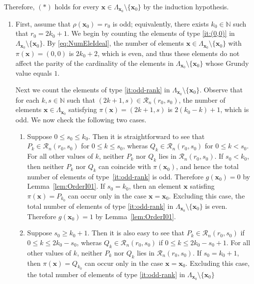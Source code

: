 \documentclass[a4paper,11pt]{amsart}
\theoremstyle{definition}
\newenvironment{demo}[1]{%
  \trivlist
  \item[\hskip\labelsep
        {\bf #1.}]
}{%
\hfill\qedsymbol
  \endtrivlist
}
\numberwithin{equation}{section}
\def\Non{\mathbb{N}}
\def\R#1{\mathcal{R}_{#1}}
\def\x{\boldsymbol{x}}
\def\rkf{\rho}
\begin{document}
\begin{demo}{Proof of Theorem~\ref{th:ASM-ideal}}
Therefore, $(*)$ holds for every $\x\in\Lambda_{\x_{0}}\setminus\{\x_{0}\}$ by the induction hypothesis.
%
\begin{enumerate}[label=\arabic*), leftmargin=20pt]
%
\item
First, assume that $\rkf(\x_{0})=r_{0}$ is odd;
equivalently, there exists $k_{0}\in\Non$ such that $r_{0}=2k_{0}+1$.
We begin by counting the elements of type \ref{it:(0,0)} in $\Lambda_{\x_{0}}\setminus\{\x_{0}\}$.
By \eqref{eq:NumEleIdeal},
the number of elements $\x\in\Lambda_{\x_{0}}\setminus\{\x_{0}\}$ with $\pi(\x)=(0,0)$ is $2k_{0}+2$,
which is even,
and thus these elements do not affect the parity of the cardinality of the elements in $\Lambda_{\x_{0}}\setminus\{\x_{0}\}$ 
whose Grundy value equals $1$.
%
\par
%
Next we count the elements of type \ref{it:odd-rank} in $\Lambda_{\x_{0}}\setminus\{\x_{0}\}$.
Observe that for each $k,s\in\Non$ such that $(2k+1,s)\in\R{n}(r_{0},s_{0})$,
the number of elements $\x\in\Lambda_{\x_{0}}$ satisfying $\pi(\x)=(2k+1,s)$ is $2(k_{0}-k)+1$,
which is odd.
We now check the following two cases.
\begin{enumerate}[label=\alph*)]
\item
Suppose $0\leq s_{0}\leq k_{0}$.
Then it is straightforward to see that $P_{k}\in \R{n}(r_{0},s_{0})$ for $0\leq k\leq s_{0}$,
wheras $Q_{k}\in \R{n}(r_{0},s_{0})$ for $0\leq k< s_{0}$.
For all other values of $k$, neither $P_{k}$ nor $Q_{k}$ lies in $\R{n}(r_{0},s_{0})$.
If $s_{0}< k_{0}$,
then neither $P_{k}$ nor $Q_{k}$ can coincide with $\pi(\x_{0})$,
and hence the total number of elements of type~\ref{it:odd-rank} is odd.
Therefore $g(\x_{0})=0$ by Lemma~\ref{lem:OrderI01}.
If $s_{0}=k_{0}$,
then an element $\x$ satisfing $\pi(\x)=P_{k_{0}}$ can occur only in the case $\x=\x_{0}$.
Excluding this case,
the total number of elements of type \ref{it:odd-rank} in $\Lambda_{\x_{0}}\setminus\{\x_{0}\}$
is even.
Therefore $g(\x_{0})=1$ by Lemma~\ref{lem:OrderI01}.
%
\item
Suppose $s_{0}\geq k_{0}+1$.
Then it is also easy to see that $P_{k}\in \R{n}(r_{0},s_{0})$ if $0\leq k\leq 2k_{0}-s_{0}$,
wheras $Q_{k}\in \R{n}(r_{0},s_{0})$ if $0\leq k\leq 2k_{0}-s_{0}+1$.
For all other values of $k$, neither $P_{k}$ nor $Q_{k}$ lies in $\R{n}(r_{0},s_{0})$.
If $s_{0}=k_{0}+1$,
then $\pi(\x)=Q_{k_{0}}$ can occur only in the case $\x=\x_{0}$.
Excluding this case,
the total number of elements of type \ref{it:odd-rank} in $\Lambda_{\x_{0}}\setminus\{\x_{0}\}$

\end{enumerate}
\end{enumerate}
\end{demo}
\end{document}
